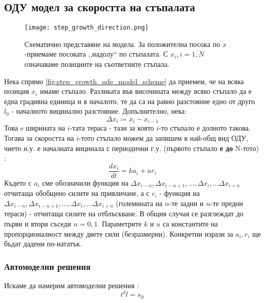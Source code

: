 \subsection{ОДУ модел за скоростта на стъпалата}
\begin{figure}[htbp]
	\centering
	\texttt{[image: step\_growth\_direction.png]}
	\caption{Схематично представяне на модела. За положителна посока по $x$-приемаме посоката ,,надолу`` по стъпалата. С $x_{i}, i = \overline{1, N}$ означаваме позициите на съответните стъпала.}
	\label{fig:step_growth_ode_model_scheme}
\end{figure}
Нека спрямо \autoref{fig:step_growth_ode_model_scheme} да приемем, че на всяка позиция $x_{i}$ имаме стъпало. Разликата във височината между всяко стъпало да е една градивна единица и в началото, те да са на равно разстояние едно от друго $l_0$ - началното вицинално разстояние. Допълнително, нека:
\begin{equation*}
    \Delta x_i \coloneqq x_i - x_{i - 1}
\end{equation*}
Това e ширината на $i$-тата тераса - тази за която $i$-то стъпало е долното такова.
Тогава за скоростта на $i$-тото стъпало можем да запишем в най-общ вид ОДУ, чието н.у. е началната вицинала с периодични г.у. (първото стъпало \textbf{е до} N-тото) \cite{Krasteva2016}:
\begin{equation}
    \frac{d x_i}{d t} = k a_i + u r_i
    \label{eq:general_step_velocity_ode}
\end{equation}
Където с $a_i$ сме обозначили функция на $\Delta x_{i-n}, \Delta x_{i-n + 1}, ..., \Delta x_{i}, ... \Delta x_{i + n} $ отчитаща обобщено силите на привличане, а с $r_{i}$ - функция на  $\Delta x_{i-n}, \Delta x_{i-n + 1}, ..., \Delta x_{i}, ... \Delta x_{i + n}$ (големината на $n$-те задни и $n$-те предни тераси) - отчитаща силите на отблъскване. В общия случая се разглеждат до първи и втори съседи $n = 0,1$. Параметрите $k$ и $u$ са константите на пропорционалност между двете сили (безразмерни). Конкретни изрази за $a_i, r_i$ ще бъдат дадени по-нататък. 

\subsubsection{Автомоделни решения}
Искаме да намерим автомоделни решения \cite{Barenblatt1996} \cite{Krasteva2016}:
\begin{equation}
    t^\delta l = s_{l t} 
    \label{eq:dimensional_scaling}
\end{equation}

